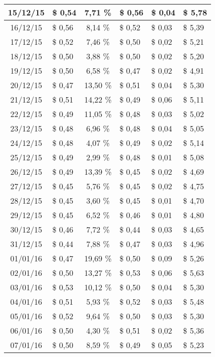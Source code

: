 \begin{center}
\begin{small}
\begin{longtable}{|c|l|c|l|l|l|}
15/12/15 & \$ 0,54 & 7,71 \% & \$ 0,56 & \$ 0,04 & \$ 5,78 \\ \hline
16/12/15 & \$ 0,56 & 8,14 \% & \$ 0,52 & \$ 0,03 & \$ 5,39 \\ \hline
17/12/15 & \$ 0,52 & 7,46 \% & \$ 0,50 & \$ 0,02 & \$ 5,21 \\ \hline
18/12/15 & \$ 0,50 & 3,88 \% & \$ 0,50 & \$ 0,02 & \$ 5,20 \\ \hline
19/12/15 & \$ 0,50 & 6,58 \% & \$ 0,47 & \$ 0,02 & \$ 4,91 \\ \hline
20/12/15 & \$ 0,47 & 13,50 \% & \$ 0,51 & \$ 0,04 & \$ 5,30 \\ \hline
21/12/15 & \$ 0,51 & 14,22 \% & \$ 0,49 & \$ 0,06 & \$ 5,11 \\ \hline
22/12/15 & \$ 0,49 & 11,05 \% & \$ 0,48 & \$ 0,03 & \$ 5,02 \\ \hline
23/12/15 & \$ 0,48 & 6,96 \% & \$ 0,48 & \$ 0,04 & \$ 5,05 \\ \hline
24/12/15 & \$ 0,48 & 4,07 \% & \$ 0,49 & \$ 0,02 & \$ 5,14 \\ \hline
25/12/15 & \$ 0,49 & 2,99 \% & \$ 0,48 & \$ 0,01 & \$ 5,08 \\ \hline
26/12/15 & \$ 0,49 & 13,39 \% & \$ 0,45 & \$ 0,02 & \$ 4,69 \\ \hline
27/12/15 & \$ 0,45 & 5,76 \% & \$ 0,45 & \$ 0,02 & \$ 4,75 \\ \hline
28/12/15 & \$ 0,45 & 3,60 \% & \$ 0,45 & \$ 0,01 & \$ 4,70 \\ \hline
29/12/15 & \$ 0,45 & 6,52 \% & \$ 0,46 & \$ 0,01 & \$ 4,80 \\ \hline
30/12/15 & \$ 0,46 & 7,72 \% & \$ 0,44 & \$ 0,03 & \$ 4,65 \\ \hline
31/12/15 & \$ 0,44 & 7,88 \% & \$ 0,47 & \$ 0,03 & \$ 4,96 \\ \hline
01/01/16 & \$ 0,47 & 19,69 \% & \$ 0,50 & \$ 0,09 & \$ 5,26 \\ \hline
02/01/16 & \$ 0,50 & 13,27 \% & \$ 0,53 & \$ 0,06 & \$ 5,63 \\ \hline
03/01/16 & \$ 0,53 & 10,12 \% & \$ 0,50 & \$ 0,04 & \$ 5,30 \\ \hline
04/01/16 & \$ 0,51 & 5,93 \% & \$ 0,52 & \$ 0,03 & \$ 5,48 \\ \hline
05/01/16 & \$ 0,52 & 9,64 \% & \$ 0,50 & \$ 0,03 & \$ 5,30 \\ \hline
06/01/16 & \$ 0,50 & 4,30 \% & \$ 0,51 & \$ 0,02 & \$ 5,36 \\ \hline
07/01/16 & \$ 0,50 & 8,59 \% & \$ 0,49 & \$ 0,05 & \$ 5,23 \\ \hline

\end{longtable}
\end{small}
\end{center}
